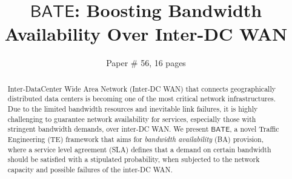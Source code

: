 \documentclass[sigconf]{acmart}
\begin{document}
\title{\bf $\mathsf{BATE}$: Boosting Bandwidth Availability Over Inter-DC WAN}


\author{Paper \# 56, 16 pages}


\begin{abstract}
Inter-DataCenter Wide Area Network (Inter-DC WAN) that connects geographically distributed data centers is becoming one of the most critical network infrastructures.
Due to the limited bandwidth resources and inevitable link failures, it is highly challenging to guarantee network availability for services, especially those with stringent bandwidth demands, over inter-DC WAN.
We present $\mathsf{BATE}$,
a novel Traffic Engineering (TE)  framework that 
aims for \textit{bandwidth availability} (BA) provision, where a service level agreement (SLA) defines that a demand on certain bandwidth should be satisfied with a stipulated probability,  when subjected to the network capacity and possible failures of the inter-DC WAN.

\end{abstract}
\end{document}
